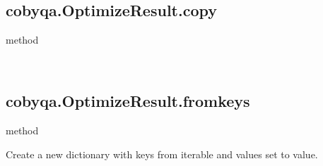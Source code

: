 \documentclass[letterpaper,10pt,english]{sphinxmanual}
\begin{document}
\begin{fulllineitems}
\begin{fulllineitems}
\label{\detokenize{refs/generated/cobyqa.OptimizeResult.clear:cobyqa.OptimizeResult.clear}}~
\end{fulllineitems}



\subsection{cobyqa.OptimizeResult.copy}
\label{\detokenize{refs/generated/cobyqa.OptimizeResult.copy:cobyqa-optimizeresult-copy}}\label{\detokenize{refs/generated/cobyqa.OptimizeResult.copy::doc}}
\sphinxAtStartPar
method

\begin{fulllineitems}
\label{\detokenize{refs/generated/cobyqa.OptimizeResult.copy:cobyqa.OptimizeResult.copy}}~
\end{fulllineitems}



\subsection{cobyqa.OptimizeResult.fromkeys}
\label{\detokenize{refs/generated/cobyqa.OptimizeResult.fromkeys:cobyqa-optimizeresult-fromkeys}}\label{\detokenize{refs/generated/cobyqa.OptimizeResult.fromkeys::doc}}
\sphinxAtStartPar
method

\begin{fulllineitems}
\label{\detokenize{refs/generated/cobyqa.OptimizeResult.fromkeys:cobyqa.OptimizeResult.fromkeys}}
\sphinxAtStartPar
Create a new dictionary with keys from iterable and values set to value.

\end{fulllineitems}




\end{fulllineitems}
\end{document}
